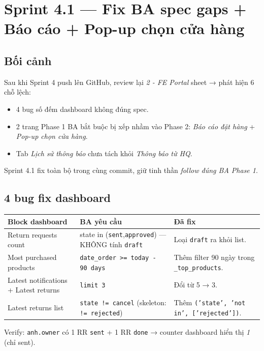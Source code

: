 \chapter{Sprint 4.1 --- Fix BA spec gaps + Báo cáo + Pop-up chọn cửa hàng}

\section{Bối cảnh}

Sau khi Sprint 4 push lên GitHub, review lại \emph{2 - FE Portal} sheet → phát hiện 6 chỗ lệch:

\begin{itemize}
    \item 4 bug số đếm dashboard không đúng spec.
    \item 2 trang Phase 1 BA bắt buộc bị xếp nhầm vào Phase 2: \emph{Báo cáo đặt hàng} + \emph{Pop-up chọn cửa hàng}.
    \item Tab \emph{Lịch sử thông báo} chưa tách khỏi \emph{Thông báo từ HQ}.
\end{itemize}

Sprint 4.1 fix toàn bộ trong cùng commit, giữ tinh thần \emph{follow đúng BA Phase 1}.

\section{4 bug fix dashboard}

\begin{longtable}{p{4.5cm} p{4.5cm} p{5.5cm}}
\toprule
\textbf{Block dashboard} & \textbf{BA yêu cầu} & \textbf{Đã fix} \\
\midrule
\endhead
Return requests count & state in (\texttt{sent},\texttt{approved}) — KHÔNG tính \texttt{draft} & Loại \texttt{draft} ra khỏi list. \\
Most purchased products & \texttt{date\_order >= today - 90 days} & Thêm filter 90 ngày trong \texttt{\_top\_products}. \\
Latest notifications + Latest returns & \texttt{limit 3} & Đổi từ 5 → 3. \\
Latest returns list & \texttt{state != cancel} (skeleton: \texttt{!= rejected}) & Thêm \texttt{('state', 'not in', ['rejected'])}. \\
\bottomrule
\end{longtable}

Verify: \texttt{anh.owner} có 1 RR \texttt{sent} + 1 RR \texttt{done} → counter dashboard hiển thị \emph{1} (chỉ sent).

